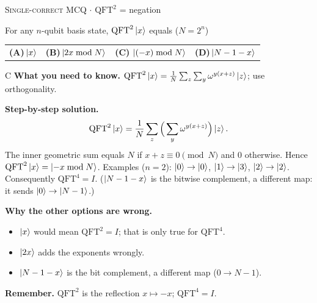 \documentclass[11pt,a4paper]{article}
\newcommand{\optlabel}[1]{\textbf{(#1)}}
\newcommand{\correctlabel}[1]{\textcolor{okgreen}{\textbf{(#1)}\,\ding{51}}}
\newenvironment{qitem}[1]{\begin{list}{}{\setlength{\leftmargin}{3.3em}\setlength{\labelwidth}{3.1em}%
  \setlength{\labelsep}{0.2em}\setlength{\topsep}{3pt}\setlength{\parsep}{3pt}}\item[\textbf{Q.#1}\hfill]}{\end{list}}
\newcommand{\qsep}{\par\vspace{2pt}{\color{black!15}\hrule}\vspace{4pt}}
\newcommand{\qmeta}[2]{{\footnotesize\color{black!60}\textsc{#1} \;$\cdot$\; #2}\par}
\newcommand{\QFTop}{\mathrm{QFT}}
\begin{document}
\begin{qitem}{48}
\qmeta{Single-correct MCQ}{$\mathrm{QFT}^2$ = negation}
For any $n$-qubit basis state, $\mathrm{QFT}^2\ket{x}$ equals ($N = 2^n$)
\par\smallskip\noindent\begin{tabularx}{\linewidth}{@{}*{4}{L}@{}}
\optlabel{A}\,$\ket{x}$ & \optlabel{B}\,$\ket{2x \bmod N}$ & \correctlabel{C}\,$\ket{(-x) \bmod N}$ & \optlabel{D}\,$\ket{N - 1 - x}$
\end{tabularx}
\end{qitem}
\begin{solbox}{C}
\textbf{\color{brand}What you need to know.} $\QFTop^2\ket x = \frac1N\sum_z\sum_y\omega^{y(x+z)}\ket z$; use orthogonality.

\textbf{\color{brand}Step-by-step solution.} \[ \mathrm{QFT}^2\ket x = \frac{1}{N}\sum_{z}\Big(\sum_y \omega^{y(x+z)}\Big)\ket z . \]
The inner geometric sum equals $N$ if $x + z \equiv 0 \pmod N$ and $0$ otherwise. Hence $\mathrm{QFT}^2\ket x = \ket{-x \bmod N}$.
Examples ($n = 2$): $\ket0 \to \ket0$, $\ket1 \to \ket3$, $\ket2 \to \ket2$. Consequently $\mathrm{QFT}^4 = I$.
($\ket{N-1-x}$ is the bitwise complement, a different map: it sends $\ket0 \to \ket{N-1}$.)

\textbf{\color{brand}Why the other options are wrong.}
\begin{itemize}[leftmargin=2.4em, itemsep=1pt, topsep=2pt]
\item[\textbf{(A)}] $\ket x$ would mean $\QFTop^2 = I$; that is only true for $\QFTop^4$.
\item[\textbf{(B)}] $\ket{2x}$ adds the exponents wrongly.
\item[\textbf{(D)}] $\ket{N-1-x}$ is the bit complement, a different map ($0\to N-1$).
\end{itemize}
\textbf{\color{brand}Remember.} $\QFTop^2$ is the reflection $x\mapsto -x$; $\QFTop^4 = I$.
\end{solbox}
\qsep
\end{document}
